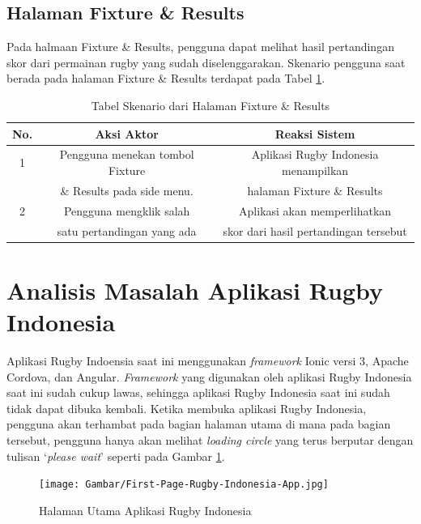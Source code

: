 \subsection{Halaman Fixture \& Results}
Pada halmaan Fixture \& Results, pengguna dapat melihat hasil pertandingan skor dari permainan rugby yang sudah diselenggarakan. Skenario pengguna saat berada pada halaman Fixture \& Results terdapat pada Tabel \ref{tab:existing-scenario-fixture-results-page}.

\begin{table} [!h]
    \centering
    \caption{Tabel Skenario dari Halaman Fixture \& Results}
    \begin{tabular}{|c|c|c|}
    \hline
       No. & Aksi Aktor & Reaksi Sistem  \\ \hline
        1 & Pengguna menekan tombol Fixture & Aplikasi Rugby Indonesia menampilkan \\
         & \& Results pada side menu. & halaman Fixture \& Results \\ \hline
        2 & Pengguna mengklik salah & Aplikasi akan memperlihatkan \\ 
         & satu pertandingan yang ada & skor dari hasil pertandingan tersebut \\ \hline
    \end{tabular}
    \label{tab:existing-scenario-fixture-results-page}
\end{table}

\section{Analisis Masalah Aplikasi Rugby Indonesia}

Aplikasi Rugby Indoensia saat ini menggunakan \textit{framework} Ionic versi 3, Apache Cordova, dan Angular. \textit{Framework} yang digunakan oleh aplikasi Rugby Indonesia saat ini sudah cukup lawas, sehingga aplikasi Rugby Indonesia saat ini sudah tidak dapat dibuka kembali. Ketika membuka aplikasi Rugby Indonesia, pengguna akan terhambat pada bagian halaman utama di mana pada bagian tersebut, pengguna hanya akan melihat \textit{loading circle} yang terus berputar dengan tulisan `\textit{please wait}' seperti pada Gambar \ref{fig:first-page-rugby-indonesia-app}.

\begin{figure} [H]
    \centering
    \texttt{[image: Gambar/First-Page-Rugby-Indonesia-App.jpg]}
    \caption{Halaman Utama Aplikasi Rugby Indonesia}
    \label{fig:first-page-rugby-indonesia-app}
\end{figure}

